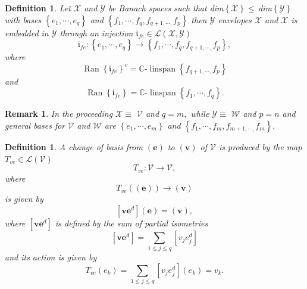 \documentclass[aps,preprint]{revtex4}%
\newtheorem{definition}[theorem]{Definition}
\newtheorem{remark}[theorem]{Remark}
\begin{document}
\begin{definition}
Let $\mathcal{X}$ and $\mathcal{Y}$ be Banach spaces such that dim$\left\{
\mathcal{X}\right\}  \leq\,$dim$\left\{  \mathcal{Y}\right\}  $ with bases
$\left\{  e_{1},\cdots,e_{q}\right\}  $ and $\left\{  f_{1},\cdots
,f_{q},f_{q+1,\cdots,}f_{p}\right\}  $ then $\mathcal{Y}$ \emph{envelopes
}$\mathcal{X}$ and $\mathcal{X}$ is \emph{embedded }in $\mathcal{Y}$ through
an injection $\mathfrak{i}_{fe}\in\mathcal{L}\left(  \mathcal{X}%
,\mathcal{Y}\right)  $
\begin{equation}
\mathfrak{i}_{fe}:\left\{  e_{1},\cdots,e_{q}\right\}  \rightarrow\left\{
f_{1},\cdots,f_{q},f_{q+1,\cdots,}f_{p}\right\}  ,
\end{equation}
where
\begin{equation}
\operatorname{Ran}\left\{  \mathfrak{i}_{fe}\right\}  ^{c}=\mathbb{C}%
\text{-}\operatorname*{linspan}\left\{  f_{q+1,\cdots,}f_{p}\right\}
\end{equation}
and
\begin{equation}
\operatorname{Ran}\left\{  \mathfrak{i}_{fe}\right\}  =\mathbb{C}%
\text{-}\operatorname*{linspan}\left\{  f_{1},\cdots,f_{q}\right\}  .
\end{equation}

\end{definition}

\begin{remark}
In the proceeding $\mathcal{X\equiv}$ $\mathcal{V}$ and $q=m,$ while
$\mathcal{Y\equiv}$ $\mathcal{W}$ and $p=n$ and general bases for
$\mathcal{V}$ and $\mathcal{W}$ are $\left\{  e_{1},\cdots,e_{m}\right\}  $
and $\left\{  f_{1},\cdots,f_{m},f_{m+1,\cdots,}f_{m}\right\}  .$
\end{remark}

\begin{definition}
A change of basis from $\left(  \mathbf{e}\right)  $ to $\left(
\boldsymbol{v}\right)  $ of $\mathcal{V}$ is produced by the map $T_{ve}%
\in\mathcal{L}\left(  \mathcal{V}\right)  $
\begin{equation}
T_{ve}:\mathcal{V\rightarrow V},
\end{equation}
where
\begin{equation}
T_{ve}\left(  \left(  \mathbf{e}\right)  \right)  \rightarrow\left(
\boldsymbol{v}\right)
\end{equation}
is given by
\begin{equation}
\left[  \boldsymbol{v}\mathbf{e}^{d}\right]  \left(  \mathbf{e}\right)
=\left(  \boldsymbol{v}\right)  ,
\end{equation}
where $\left[  \boldsymbol{v}\mathbf{e}^{d}\right]  $ is defined by the sum of
partial isometries
\begin{equation}
\left[  \boldsymbol{v}\mathbf{e}^{d}\right]  =\sum_{1\leq j\leq q}\left[
v_{j}e_{j}^{d}\right]
\end{equation}
and its action is given by
\begin{equation}
T_{ve}\left(  e_{k}\right)  =\sum_{1\leq j\leq q}\left[  v_{j}e_{j}%
^{d}\right]  \left(  e_{k}\right)  =v_{k}.
\end{equation}

\end{definition}
\end{document}
